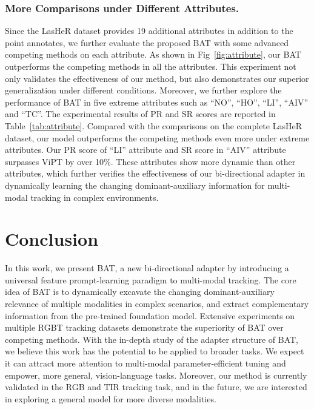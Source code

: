 \documentclass[letterpaper]{article} %
\begin{document}
\subsubsection{More Comparisons under Different Attributes.}
Since the LasHeR dataset provides 19 additional attributes
in addition to the point annotates, we further evaluate the proposed BAT with some advanced competing methods on each attribute. As shown in Fig~\ref{fig:attribute}, our BAT outperforms the competing methods in all the attributes. This experiment not only validates the effectiveness of our method, but also demonstrates our superior generalization under different conditions. Moreover, we further explore the performance of BAT in five extreme attributes such as ``NO'', ``HO'', ``LI'', ``AIV'' and ``TC''. The experimental results of PR and SR scores are reported in Table~\ref{tab:attribute}. Compared with the comparisons on the complete LasHeR dataset, our model outperforms the competing methods even more under extreme attributes. Our PR score of ``LI'' attribute and SR score in ``AIV'' attribute  surpasses ViPT by over 10\%. These attributes show more dynamic than other attributes, which further verifies the effectiveness of our bi-directional adapter in dynamically learning the changing dominant-auxiliary information for multi-modal tracking in complex environments.



\section{Conclusion}

In this work, we present BAT, a new bi-directional adapter by introducing a universal feature prompt-learning paradigm to multi-modal tracking.
The core idea of BAT is to dynamically excavate the changing dominant-auxiliary relevance of multiple modalities in complex scenarios, and extract complementary information from the pre-trained foundation model.
Extensive experiments on multiple RGBT tracking datasets demonstrate the superiority of BAT over competing methods. With the in-depth study of the adapter structure of BAT, we believe this work has the potential to be applied to broader tasks. We expect it can attract more attention to multi-modal parameter-efficient tuning and empower, more general, vision-language tasks. Moreover, our method is currently validated in the RGB and TIR tracking task, and in the future, we are interested in exploring a general model for more diverse modalities.
\end{document}
